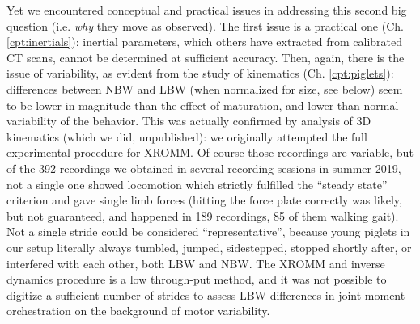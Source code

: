 Yet we encountered conceptual and practical issues in addressing this second big question (i.e. \emph{why} they move as observed).
The first issue is a practical one (Ch. \ref{cpt:inertials}): inertial parameters, which others have extracted from calibrated CT scans, cannot be determined at sufficient accuracy.
Then, again, there is the issue of variability, as evident from the study of kinematics (Ch. \ref{cpt:piglets}):
differences between NBW and LBW (when normalized for size, see below) seem to be lower in magnitude than the effect of maturation, and lower than normal variability of the behavior.
This was actually confirmed by analysis of 3D kinematics (which we did, unpublished): we originally attempted the full experimental procedure for XROMM.
Of course those recordings are variable, but of the 392 recordings we obtained in several recording sessions in summer 2019, not a single one showed locomotion which strictly fulfilled the ``steady state'' criterion and gave single limb forces (hitting the force plate correctly was likely, but not guaranteed, and happened in 189 recordings, 85 of them walking gait).
Not a single stride could be considered ``representative'', because young piglets in our setup literally always tumbled, jumped, sidestepped, stopped shortly after, or interfered with each other, both LBW and NBW.
The XROMM and inverse dynamics procedure is a low through-put method, and it was not possible to digitize a sufficient number of strides to assess LBW differences in joint moment orchestration on the background of motor variability.



